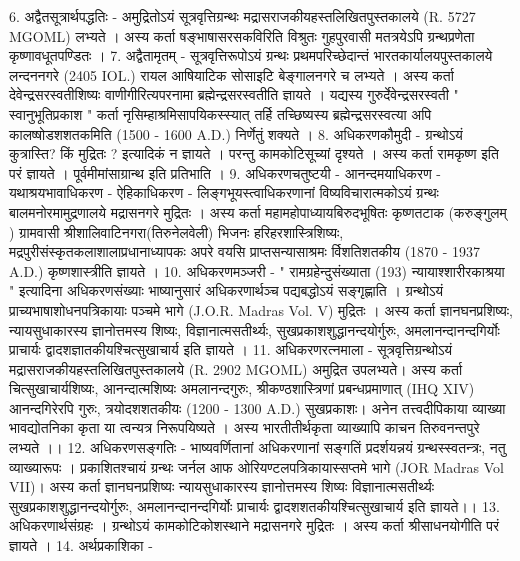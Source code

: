 6. अद्वैतसूत्रार्थपद्धतिः -
अमुद्रितोऽयं सूत्रवृत्तिग्रन्थः मद्रासराजकीयहस्तलिखितपुस्तकालये (R. 5727 MGOML) लभ्यते । अस्य कर्ता षङ्भाषासरसकविरिति विश्रुतः गुहपुरवासी मतत्रयेऽपि ग्रन्थप्रणेता कृष्णावधूतपण्डितः । 
7. अद्वैतामृतम् -
सूत्रवृत्तिरूपोऽयं ग्रन्थः प्रथमपरिच्छेदान्तं भारतकार्यालयपुस्तकालये लन्दननगरे (2405 IOL.) रायल आषियाटिक सोसाइटि बेङ्गालनगरे च लभ्यते । अस्य कर्ता देवेन्द्रसरस्वतीशिष्यः वाणीगीरित्यपरनामा ब्रह्मेन्द्रसरस्वतीति ज्ञायते । यद्यस्य गुरुर्देवेन्द्रसरस्वती " स्वानुभूतिप्रकाश " कर्ता नृसिम्हाश्रमिसापयिकस्स्यात् तर्हि तच्छिष्यस्य ब्रह्मेन्द्रसरस्वत्या अपि कालष्षोडशशतकमिति (1500 - 1600 A.D.) निर्णेतुं शक्यते । 
8. अधिकरणकौमुदी - 
ग्रन्थोऽयं कुत्रास्ति? किं मुद्रितः ? इत्यादिकं न ज्ञायते । परन्तु कामकोटिसूच्यां दृश्यते । अस्य कर्ता रामकृष्ण इति परं ज्ञायते । पूर्वमीमांसाग्रान्थ इति प्रतिभाति । 
9. अधिकरणचतुष्टयी - 
आनन्दमयाधिकरण - यथाश्रयभावाधिकरण - ऐहिकाधिकरण - लिङ्गभूयस्त्वाधिकरणानां विष्यविचारात्मकोऽयं ग्रन्थः बालमनोरमामुद्रणालये मद्रासनगरे मुद्रितः । अस्य कर्ता महामहोपाध्यायबिरुदभूषितः कृष्णतटाक (करुङ्गुलम् ) ग्रामवासी श्रीशालिवाटिनगरा(तिरुनेलवेली) भिजनः हरिहरशास्त्रिशिष्यः, मद्रपुरीसंस्कृतकलाशालाप्रधानाध्यापकः अपरे वयसि प्राप्तसन्यासाश्रमः र्विशतिशतकीय (1870 - 1937 A.D.) कृष्णशास्त्रीति ज्ञायते । 
10. अधिकरणमञ्जरी -
 " रामग्रहेन्दुसंख्याता (193) न्यायाश्शारीरकाश्रया " इत्यादिना अधिकरणसंख्याः भाष्यानुसारं अधिकरणार्थञ्च पद्यबद्धोऽयं सङ्गृह्णाति । ग्रन्थोऽयं प्राच्यभाषाशोधनपत्रिकायाः पञ्चमे भागे (J.O.R. Madras Vol. V) मुद्रितः । अस्य कर्ता ज्ञानघनप्रशिष्यः, न्यायसुधाकारस्य ज्ञानोत्तमस्य शिष्यः, विज्ञानात्मसतीर्थ्यः, सुखप्रकाशशुद्धानन्दयोर्गुरुः, अमलानन्दानन्दगिर्योः प्राचार्यः द्वादशज्ञातकीयश्चित्सुखाचार्य इति ज्ञायते । 
11. अधिकरणरत्नमाला - 
सूत्रवृत्तिग्रन्थोऽयं मद्रासराजकीयहस्तलिखितपुस्तकालये (R. 2902 MGOML) अमुद्रित उपलभ्यते। अस्य कर्ता चित्सुखाचार्यशिष्यः, आनन्दात्मशिष्यः अमलानन्दगुरुः, श्रीकण्ठशास्त्रिणां प्रबन्धप्रमाणात् (IHQ XIV) आनन्दगिरेरपि गुरुः, त्रयोदशशतकीयः (1200 - 1300 A.D.) सुखप्रकाशः। अनेन तत्त्वदीपिकाया व्याख्या भावद्योतनिका कृता या त्वन्यत्र निरूपयिष्यते । अस्य भारतीतीर्थकृता व्याख्यापि काचन तिरुवनन्तपुरे लभ्यते ।। 
12. अधिकरणसङ्गतिः - 
भाष्यवर्णितानां अधिकरणानां सङ्गतिं प्रदर्शयन्नयं ग्रन्थस्स्वतन्त्रः, नतु व्याख्यारूपः । प्रकाशितश्चायं ग्रन्थः जर्नल आफ ओरियण्टलपत्रिकायास्सप्तमे भागे (JOR Madras Vol VII)। अस्य कर्ता ज्ञानघनप्रशिष्यः न्यायसुधाकारस्य ज्ञानोत्तमस्य शिष्यः विज्ञानात्मसतीर्थ्यः सुखप्रकाशशुद्धानन्दयोर्गुरुः, अमलानन्दानन्दगिर्योः प्राचार्यः द्वादशशतकीयश्चित्सुखाचार्य इति ज्ञायते।। 
13. अधिकरणार्थसंग्रहः । ग्रन्थोऽयं कामकोटिकोशस्थाने मद्रासनगरे मुद्रितः । अस्य कर्ता श्रीसाधनयोगीति परं ज्ञायते । 
14. अर्थप्रकाशिका -
